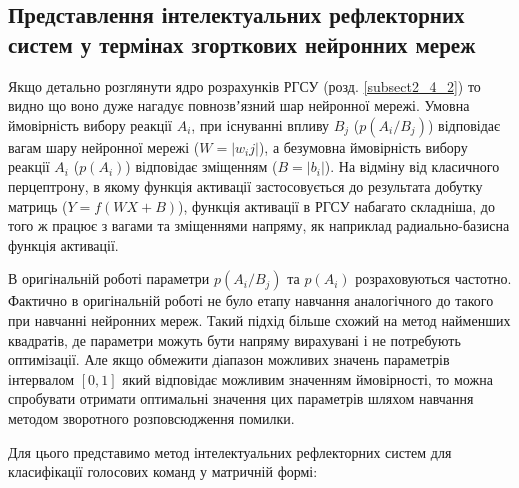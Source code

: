 \subsection{Представлення інтелектуальних рефлекторних систем у термінах згорткових нейронних мереж}

Якщо детально розглянути ядро розрахунків РГСУ (розд. \ref{subsect2_4_2}) то видно що воно дуже нагадує повнозвʼязний шар нейронної мережі. Умовна ймовірність вибору реакції $A_i$, при існуванні впливу $B_j$ ($p(A_i/B_j)$) відповідає вагам шару нейронної мережі ($W = |w_ij|$), а безумовна ймовірність вибору реакції $A_i$ ($p(A_i)$) відповідає зміщенням ($B = |b_i|$). На відміну від класичного перцептрону, в якому функція активації застосовується до результата добутку матриць ($Y=f(WX + B)$), функція активації в РГСУ набагато складніша, до того ж працює з вагами та зміщеннями напряму, як наприклад радиально-базисна функція активації.

В оригінальній роботі\cite{Teslia_2014} параметри $p(A_i/B_j)$ та $p(A_i)$ розраховуються частотно. Фактично в оригінальній роботі не було етапу навчання аналогічного до такого при навчанні нейронних мереж. Такий підхід більше схожий на метод найменших квадратів, де параметри можуть бути напряму вирахувані і не потребують оптимізації.
Але якщо обмежити діапазон можливих значень параметрів інтервалом $[0, 1]$ який відповідає можливим значенням ймовірності, то можна спробувати отримати оптимальні значення цих параметрів шляхом навчання методом зворотного розповсюдження помилки.

Для цього представимо метод інтелектуальних рефлекторних систем для класифікації голосових команд у матричній формі:

